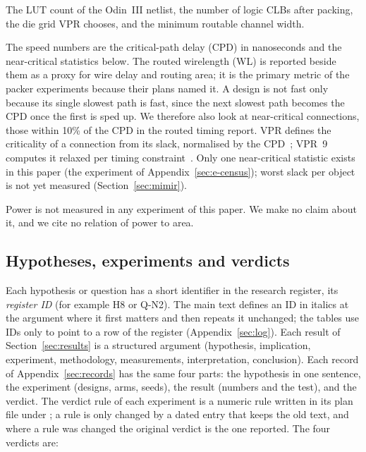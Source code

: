  The LUT count of the Odin~III netlist, the number of logic CLBs after packing, the die grid VPR chooses, and the minimum routable channel width.

 The speed numbers are the critical-path delay (CPD) in nanoseconds and the near-critical statistics below. The routed wirelength (WL) is reported beside them as a proxy for wire delay and routing area; it is the primary metric of the packer experiments because their plans named it. A design is not fast only because its single slowest path is fast, since the next slowest path becomes the CPD once the first is sped up. We therefore also look at near-critical connections, those within 10\% of the CPD in the routed timing report. VPR defines the criticality of a connection from its slack, normalised by the CPD~\cite{luu2014thesis}; VPR~9 computes it relaxed per timing constraint~\cite{wainberg2015relaxed}. Only one near-critical statistic exists in this paper (the experiment of Appendix~\ref{sec:e-census}); worst slack per object is not yet measured (Section~\ref{sec:mimir}).

 Power is not measured in any experiment of this paper. We make no claim about it, and we cite no relation of power to area.

\subsection{Hypotheses, experiments and verdicts}
\label{sec:verdicts}

Each hypothesis or question has a short identifier in the research register, its \emph{register ID} (for example H8 or Q-N2). The main text defines an ID in italics at the argument where it first matters and then repeats it unchanged; the tables use IDs only to point to a row of the register (Appendix~\ref{sec:log}). Each result of Section~\ref{sec:results} is a structured argument (hypothesis, implication, experiment, methodology, measurements, interpretation, conclusion). Each record of Appendix~\ref{sec:records} has the same four parts: the hypothesis in one sentence, the experiment (designs, arms, seeds), the result (numbers and the test), and the verdict. The verdict rule of each experiment is a numeric rule written in its plan file under ; a rule is only changed by a dated entry that keeps the old text, and where a rule was changed the original verdict is the one reported. The four verdicts are:


